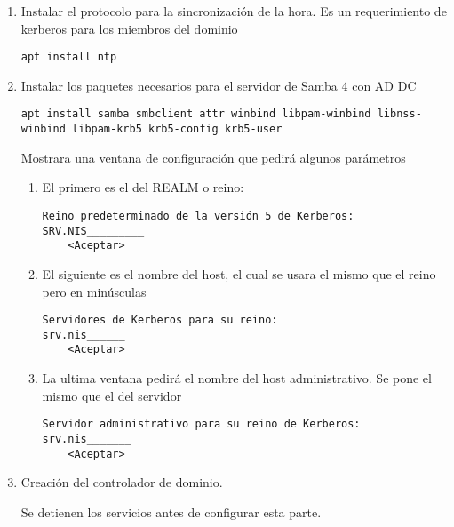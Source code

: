 \documentclass[../main.tex]{subfiles}
\begin{document}
\begin{enumerate}
\item Instalar el protocolo para la sincronización de la hora.
  Es un requerimiento de kerberos para los miembros del dominio

  \begin{lstlisting}
apt install ntp
\end{lstlisting}

  \item Instalar los paquetes necesarios para el servidor de
    Samba 4 con AD DC

    \begin{lstlisting}
apt install samba smbclient attr winbind libpam-winbind libnss-winbind libpam-krb5 krb5-config krb5-user
\end{lstlisting}

  Mostrara una ventana de configuración que pedirá algunos parámetros

  \begin{enumerate}
  \item El primero es el del REALM o reino:

    \begin{lstlisting}
Reino predeterminado de la versión 5 de Kerberos:
SRV.NIS_________
    <Aceptar>
  \end{lstlisting}

  
   \item El siguiente es el nombre del host, el cual se usara el mismo
     que el reino pero en minúsculas

     \begin{lstlisting}
Servidores de Kerberos para su reino:
srv.nis______
    <Aceptar>
\end{lstlisting}

    \item La ultima ventana pedirá el nombre del host administrativo.
      Se pone el mismo que el del servidor

      \begin{lstlisting}
Servidor administrativo para su reino de Kerberos:
srv.nis_______
    <Aceptar>
\end{lstlisting}


  
    \end{enumerate}

  \item Creación del controlador de dominio.

    Se detienen los servicios antes de configurar esta parte.


\end{enumerate}
\end{document}
